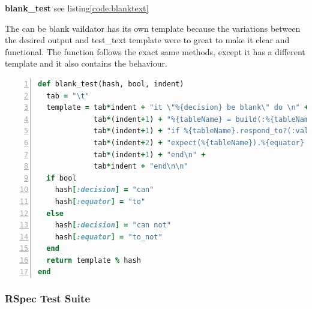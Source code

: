 \documentclass[a4paper,12pt]{article}
\begin{document}
\par \textbf{blank\_test} see listing\ref{code:blanktext}
\par The can be blank vaildator has its own template because the variations between the desired output and test\_text template were to great to make it clear and functional. The function follows the exact same methods, except it has a different template and it also contains the behaviour. 
\begin{landscape}
\begin{lstlisting}[frame=single,numbers=left,language = ruby,caption= {blank\_test}, label={code:blanktext}]
def blank_test(hash, bool, indent)
  tab = "\t" 
  template = tab*indent + "it \"%{decision} be blank\" do \n" +
             tab*(indent+1) + "%{tableName} = build(:%{tableName}, %{fieldName}: nil)\n" +
             tab*(indent+1) + "if %{tableName}.respond_to?(:valid?)\n" +
             tab*(indent+2) + "expect(%{tableName}).%{equator} be_valid, lambda {%{tableName}.errors.full_messages.join(\"\\n\")}\n" +
             tab*(indent+1) + "end\n" +
             tab*indent + "end\n\n"
  if bool
    hash[:decision] = "can"
    hash[:equator] = "to"
  else
    hash[:decision] = "can not"
    hash[:equator] = "to_not"
  end    
  return template % hash
end
\end{lstlisting}
\end{landscape}
\subsubsection{RSpec Test Suite}
\end{document}
